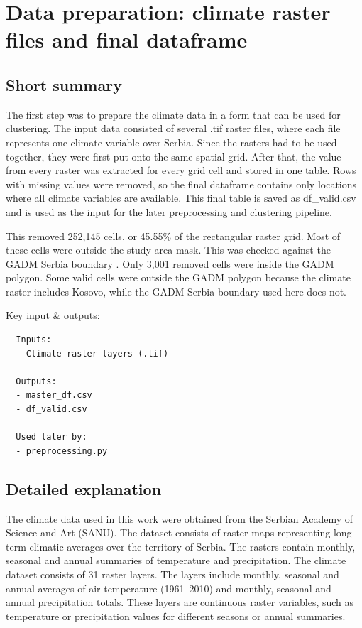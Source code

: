 \documentclass[11pt]{article}
\begin{document}
\section{Data preparation: climate raster files and final dataframe}
\label{sec:data-prep}

\subsection{Short summary}
The first step was to prepare the climate data in a form that can be used for clustering. The input data consisted of several .tif raster files, where each file represents one climate variable over Serbia. Since the rasters had to be used together, they were first put onto the same spatial grid. After that, the value from every raster was extracted for every grid cell and stored in one table. Rows with missing values were removed, so the final dataframe contains only locations where all climate variables are available. This final table is saved as df\_valid.csv and is used as the input for the later preprocessing and clustering pipeline.

This removed 252,145 cells, or 45.55\% of the rectangular raster grid. Most of these cells were outside the study-area mask. This was checked against the GADM Serbia boundary \cite{gadm2022}. Only 3,001 removed cells were inside the GADM polygon. Some valid cells were outside the GADM polygon because the climate raster includes Kosovo, while the GADM Serbia boundary used here does not.

Key input \& outputs:
\begin{verbatim}
  Inputs:
  - Climate raster layers (.tif)

  Outputs:
  - master_df.csv
  - df_valid.csv

  Used later by:
  - preprocessing.py
\end{verbatim}

\subsection{Detailed explanation}
The climate data used in this work were obtained from the Serbian Academy of Science and Art (SANU). The dataset consists of raster maps representing long-term climatic averages over the territory of Serbia. The rasters contain monthly, seasonal and annual summaries of temperature and precipitation. 
The climate dataset consists of 31 raster layers. The layers include monthly, seasonal and annual averages of air temperature (1961–2010) and monthly, seasonal and annual precipitation totals. These layers are continuous raster variables, such as temperature or precipitation values for different seasons or annual summaries.
\end{document}
